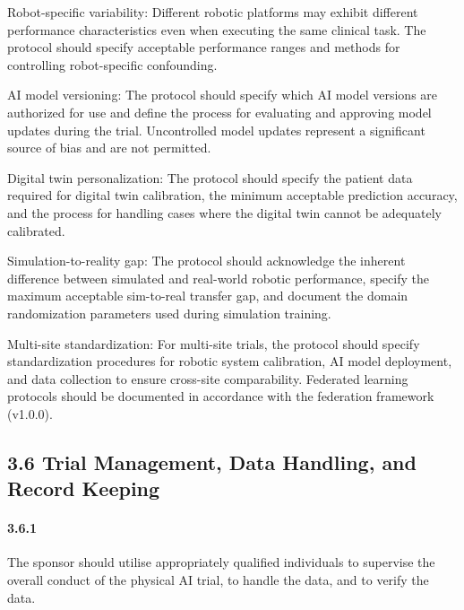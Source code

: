 \documentclass[11pt]{article}
\begin{document}
\begin{description}[leftmargin=2.5cm,style=sameline]

\item[(a)] Robot-specific variability: Different robotic platforms may exhibit different performance characteristics even when executing the same clinical task. The protocol should specify acceptable performance ranges and methods for controlling robot-specific confounding.

\item[(b)] AI model versioning: The protocol should specify which AI model versions are authorized for use and define the process for evaluating and approving model updates during the trial. Uncontrolled model updates represent a significant source of bias and are not permitted.

\item[(c)] Digital twin personalization: The protocol should specify the patient data required for digital twin calibration, the minimum acceptable prediction accuracy, and the process for handling cases where the digital twin cannot be adequately calibrated.

\item[(d)] Simulation-to-reality gap: The protocol should acknowledge the inherent difference between simulated and real-world robotic performance, specify the maximum acceptable sim-to-real transfer gap, and document the domain randomization parameters used during simulation training.

\item[(e)] Multi-site standardization: For multi-site trials, the protocol should specify standardization procedures for robotic system calibration, AI model deployment, and data collection to ensure cross-site comparability. Federated learning protocols should be documented in accordance with the federation framework (v1.0.0).

\end{description}

\subsection{3.6 Trial Management, Data Handling, and Record Keeping}

\paragraph{3.6.1} The sponsor should utilise appropriately qualified individuals to supervise the overall conduct of the physical AI trial, to handle the data, and to verify the data.
\end{document}
